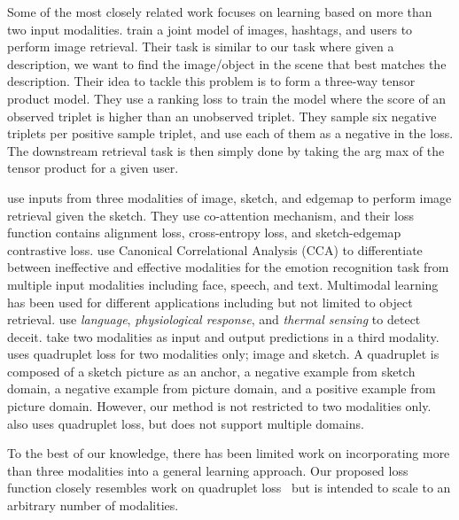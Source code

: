 \documentclass[sigconf,natbib=true,anonymous=true]{acmart}
\begin{document}
Some of the most closely related work focuses on learning based on more than two input modalities. \citet{Veit_2018_CVPR} train a joint model of images, hashtags, and users to perform image retrieval. Their task is similar to our task where given a description, we want to find the image/object in the scene that best matches the description. Their idea to tackle this problem is to form a three-way tensor product model. They use a ranking loss to train the model where the score of an observed triplet is higher than an unobserved triplet. They sample six negative triplets per positive sample triplet, and use each of them as a negative in the loss. The downstream retrieval task is then simply done by taking the arg max of the tensor product for a given user. 

\citet{semihet_three_way_Lei_2020} use inputs from three modalities of image, sketch, and edgemap to perform image retrieval given the sketch. They use co-attention mechanism, and their loss function contains alignment loss, cross-entropy loss, and sketch-edgemap contrastive loss. \citet{Mittal2020M3ER} use Canonical Correlational Analysis (CCA) to differentiate between ineffective and effective modalities for the emotion recognition task from multiple input modalities including face, speech, and text. Multimodal learning has been used for different applications including but not limited to object retrieval. \citet{Deception_ICMI_2014} use \textit{language}, \textit{physiological response}, and \textit{thermal sensing} to detect deceit. \citet{het_data_fusion_liu_IEEE_2017} take two modalities as input and output predictions in a third modality. \citet{tursun2021efficient} uses quadruplet loss for two modalities only; image and sketch. A quadruplet is composed of a sketch picture as an anchor, a negative example from sketch domain, a negative example from picture domain,  and a positive example from picture domain. However, our method is not restricted to two modalities only.~\citet{chen2017beyond} also uses quadruplet loss, but does not support multiple domains.

To the best of our knowledge, there has been limited work on incorporating more than three modalities into a general learning approach. Our proposed loss function closely resembles work on quadruplet loss~\cite{chen2017beyond,tursun2021efficient}
but is intended to scale to an arbitrary number of modalities.
\end{document}
